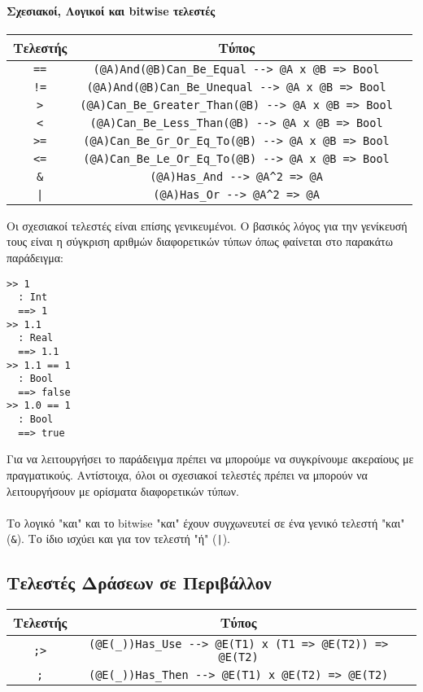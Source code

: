 \documentclass[diploma]{softlab-thesis}
\begin{document}
\paragraph{Σχεσιακοί, Λογικοί και bitwise τελεστές}

\begin{center}
\begin{tabular}{ |c|c|c| }
\hline
Τελεστής & Τύπος
\\
\hline
\hline
\verb|==| & \verb|(@A)And(@B)Can_Be_Equal --> @A x @B => Bool|
\\
\hline
\verb|!=| & \verb|(@A)And(@B)Can_Be_Unequal --> @A x @B => Bool|
\\
\hline
\verb|>| & \verb|(@A)Can_Be_Greater_Than(@B) --> @A x @B => Bool|
\\
\hline
\verb|<| & \verb|(@A)Can_Be_Less_Than(@B) --> @A x @B => Bool|
\\
\hline
\verb|>=| & \verb|(@A)Can_Be_Gr_Or_Eq_To(@B) --> @A x @B => Bool|
\\
\hline
\verb|<=| & \verb|(@A)Can_Be_Le_Or_Eq_To(@B) --> @A x @B => Bool|
\\
\hline
\verb|&| & \verb|(@A)Has_And --> @A^2 => @A|
\\
\hline
\texttt{|} & \verb|(@A)Has_Or --> @A^2 => @A|
\\
\hline
\end{tabular}
\end{center}
Οι σχεσιακοί τελεστές είναι επίσης γενικευμένοι. Ο βασικός λόγος για την
γενίκευσή τους είναι η σύγκριση αριθμών διαφορετικών τύπων όπως φαίνεται στο
παρακάτω παράδειγμα:
\begin{verbatim}
>> 1
  : Int
  ==> 1
>> 1.1
  : Real
  ==> 1.1
>> 1.1 == 1
  : Bool
  ==> false
>> 1.0 == 1
  : Bool
  ==> true
\end{verbatim}
Για να λειτουργήσει το παράδειγμα πρέπει να μπορούμε να συγκρίνουμε ακεραίους
με πραγματικούς.  Αντίστοιχα, όλοι οι σχεσιακοί τελεστές πρέπει να μπορούν να
λειτουργήσουν με ορίσματα διαφορετικών τύπων.
\\\\
Το λογικό "και" και το bitwise "και" έχουν συγχωνευτεί σε ένα γενικό
τελεστή "και" (\verb|&|). Το ίδιο ισχύει και για τον τελεστή "ή" (\texttt{|}).

\newpage
\subsection{Τελεστές Δράσεων σε Περιβάλλον}

\begin{center}
\begin{tabular}{ |c|c|c| }
\hline
Τελεστής & Τύπος
\\
\hline
\hline
\verb|;>| & \verb|(@E(_))Has_Use --> @E(T1) x (T1 => @E(T2)) => @E(T2)|
\\
\hline
\verb|;| & \verb|(@E(_))Has_Then --> @E(T1) x @E(T2) => @E(T2)|
\\
\hline
\end{tabular}
\end{center}
\end{document}
